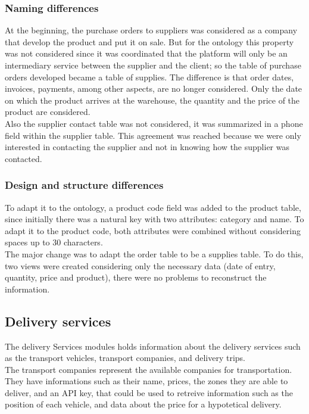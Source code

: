 \documentclass{article}
\begin{document}
\subsubsection{Naming differences}
At the beginning, the purchase orders to suppliers was considered as a company that develop the product and put it on sale. But for the ontology this property was not considered since it was coordinated that the platform will only be an intermediary service between the supplier and the client; so the table of purchase orders developed became a table of supplies. The difference is that order dates, invoices, payments, among other aspects, are no longer considered. Only the date on which the product arrives at the warehouse, the quantity and the price of the product are considered. \\

Also the supplier contact table was not considered, it was summarized in a phone field within the supplier table. This agreement was reached because we were only interested in contacting the supplier and not in knowing how the supplier was contacted.

\subsubsection{Design and structure differences}
To adapt it to the ontology, a product code field was added to the product table, since initially there was a natural key with two attributes: category and name. To adapt it to the product code, both attributes were combined without considering spaces up to 30 characters. \\

The major change was to adapt the order table to be a supplies table. To do this, two views were created considering only the necessary data (date of entry, quantity, price and product), there were no problems to reconstruct the information.

\subsection{Delivery services}
The delivery Services modules holds information about the delivery services such as the transport vehicles, transport companies, and delivery trips. \\

The transport companies represent the available companies for transportation. They have informations such as their name, prices, the zones they are able to deliver, and an API key, that could be used to retreive information such as the position of each vehicle, and data about the price for a hypotetical delivery. \\
\end{document}
